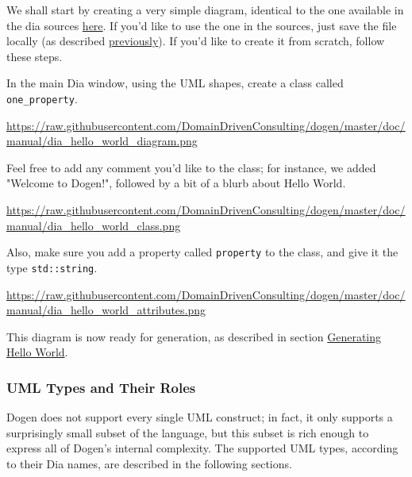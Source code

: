 \documentclass[11pt]{article}
\begin{document}
We shall start by creating a very simple diagram, identical to the one
available in the dia sources \href{https://raw.githubusercontent.com/DomainDrivenConsulting/dogen/master/diagrams/hello_world.dia}{here}. If you'd like to use the one in the
sources, just save the file locally (as described \href{https://github.com/DomainDrivenConsulting/dogen/blob/master/doc/manual/manual.org#generating-hello-world}{previously}). If
you'd like to create it from scratch, follow these steps.

In the main Dia window, using the UML shapes, create a class called
\texttt{one\_property}.

\url{https://raw.githubusercontent.com/DomainDrivenConsulting/dogen/master/doc/manual/dia_hello_world_diagram.png}

Feel free to add any comment you'd like to the class; for instance, we
added "Welcome to Dogen!", followed by a bit of a blurb about Hello
World.

\url{https://raw.githubusercontent.com/DomainDrivenConsulting/dogen/master/doc/manual/dia_hello_world_class.png}

Also, make sure you add a property called \texttt{property} to the class, and
give it the type \texttt{std::string}.

\url{https://raw.githubusercontent.com/DomainDrivenConsulting/dogen/master/doc/manual/dia_hello_world_attributes.png}

This diagram is now ready for generation, as described in section
\href{https://github.com/DomainDrivenConsulting/dogen/blob/master/doc/manual/manual.org#generating-hello-world}{Generating Hello World}.

\subsubsection{UML Types and Their Roles}
\label{sec-3-4-2}

Dogen does not support every single UML construct; in fact, it only
supports a surprisingly small subset of the language, but this subset
is rich enough to express all of Dogen's internal complexity. The
supported UML types, according to their Dia names, are described in
the following sections.
\end{document}
